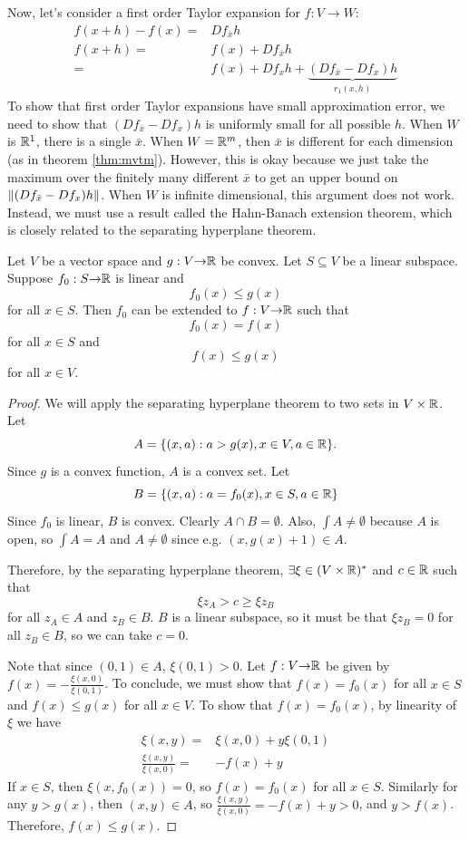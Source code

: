Now, let's consider a first order Taylor expansion for $f:V \to W$:
\begin{align*}
    f(x+h) - f(x) = & Df_{\bar{x}} h \\
    f(x+h) = & f(x) + Df_{\bar{x}} h \\
    = & f(x) + Df_{x} h + \underbrace{(Df_{\bar{x}} -Df_x)h}_{r_1(x,h)}  
\end{align*}
To show that first order Taylor expansions
have small approximation error, we need to show that
$(Df_{\bar{x}} -Df_x)h$ is uniformly small for all possible $h$. When
$W$ is $\mathbb{R}^1$, there is a single $\bar{x}$. When $W = \mathbb{R}^m$, then
$\bar{x}$ is different for each dimension (as in theorem
\ref{thm:mvtm}). However, this is okay because we just take the
maximum over the finitely many different $\bar{x}$ to get an upper
bound on $\left\Vert {(Df_{\bar{x}} -Df_x)h} \right\Vert$. When $W$ is infinite
dimensional, this argument does not work. Instead, we must use a
result called the Hahn-Banach extension theorem, which is closely
related to the separating hyperplane theorem.
\begin{theorem}
  Let $V$ be a vector space and $g:V {\rightarrow} \mathbb{R}$ be convex. Let
  $S\subseteq V$ be a linear subspace. Suppose $f_0:
  S {\rightarrow} \mathbb{R}$ is linear and 
  \[ f_0(x) \leq g(x) \] 
  for all $x \in S$. Then $f_0$ can be extended to $f:V {\rightarrow} \mathbb{R}$ such
  that 
  \[ f_0(x) = f(x) \]
  for all $x \in S$ and
  \[ f(x) \leq g(x) \]
  for all $x \in V$.
\end{theorem}
\begin{proof}
  We will apply the separating hyperplane theorem to two sets in $V
  \times \mathbb{R}$. Let 
  \[ A = \{(x,a): a > g(x), x \in V, a \in
    \mathbb{R}\}.\]
  Since $g$ is a convex function, $A$ is a convex set. Let
  \[ B = \{(x,a): a = f_0(x), x \in S, a \in \mathbb{R} \} \]
  Since $f_0$ is linear, $B$ is convex. 
  Clearly $A \cap B = \emptyset$. Also, $\int A \neq \emptyset$
  because $A$ is open, so $\int A = A$ and $A \neq \emptyset$ since
  e.g. $(x, g(x) +1) \in A$. 

  Therefore, by the separating hyperplane theorem,
  $\exists \xi \in (V \times \mathbb{R})^*$ and $c \in \mathbb{R}$ such that
  \[ \xi z_A > c \geq \xi z_B \]
  for all $z_A \in A$ and $z_B \in B$. $B$ is a linear subspace, so it
  must be that $\xi z_B = 0$ for all $z_B \in B$, so we can take
  $c=0$. 
  
  Note that since $(0,1) \in A$, $\xi(0,1) > 0$. Let $f: V {\rightarrow} \mathbb{R}$ be
  given by $f(x) = -\frac{\xi(x,0)}{\xi(0,1)}$. To conclude, we must
  show that $f(x) = f_0(x) $ for all $x \in S$ and $f(x) \leq g(x)$
  for all $x \in V$.  To show that $f(x) = f_0(x) $, by linearity of
  $\xi$ we have
  \begin{align*}
    \xi(x,y) = & \xi(x,0) + y\xi(0,1) \\
    \frac{\xi(x,y)}{\xi(x,0)} = & -f(x) + y 
  \end{align*}
  If $x \in S$, then $\xi(x,f_0(x)) = 0$, so $f(x) = f_0(x)$ for all
  $x \in S$.
  Similarly for any $y > g(x)$, then $(x,y) \in A$, so
  $\frac{\xi(x,y)}{\xi(x,0)} = -f(x) + y>0$, and $y >
  f(x)$. Therefore, $f(x) \leq g(x)$.
\end{proof}
